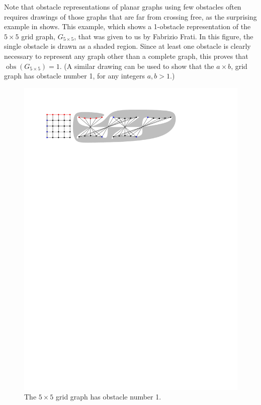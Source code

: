 \documentclass{patmorin}
\DeclareMathOperator{\obs}{obs}
\begin{document}
Note that obstacle representations of planar graphs using few obstacles
often requires drawings of those graphs that are far from crossing free,
as the surprising example in  shows.  This example,
which shows a 1-obstacle representation of the $5\times 5$ grid graph,
$G_{5\times 5}$, that was given to us by Fabrizio Frati. In this figure,
the single obstacle is drawn as a shaded region. Since at least one
obstacle is clearly necessary to represent any graph other than a complete
graph, this proves that $\obs(G_{5\times 5}) = 1$.  (A similar drawing can
be used to show that the $a\times b$, grid graph has obstacle number 1,
for any integers $a,b>1$.)

\begin{figure}[hbpt]
  \begin{center}
    \includegraphics{fivebyfive}
  \end{center}  
  \caption{The $5\times 5$ grid graph has obstacle number 1.}
\end{figure}
\end{document}
